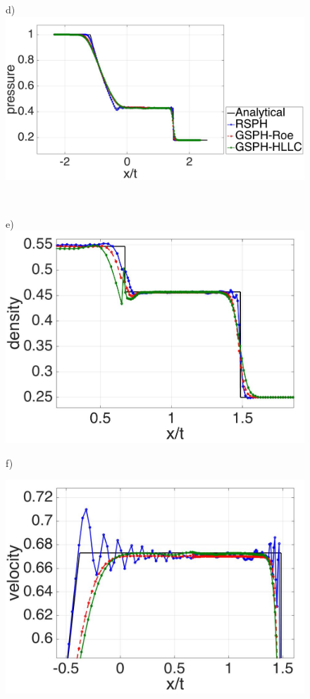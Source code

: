 \documentclass[review]{elsarticle}
\begin{document}
\begin{figure}[H]
\begin{minipage}{.45\textwidth}
    \end{minipage}%
    \begin{minipage}{.545 \textwidth}
        \centering d)
        \includegraphics[width=0.99 \textwidth,height=0.4954\textwidth]{./Figures/RCM-Sod-GSPH-compare-p}
    \end{minipage}%
    \\
    \begin{minipage}{.45\textwidth}
        \centering e)
        \includegraphics[width=0.99 \textwidth,height=0.6\textwidth]{./Figures/RCM-Sod-GSPH-compare-rho-zoom}
    \end{minipage}%
    \begin{minipage}{.545\textwidth}
    \centering f)
        \begin{flushleft}
        \includegraphics[width= 0.8174 \textwidth, height=0.4954 \textwidth]{./Figures/RCM-Sod-GSPH-compare-v-zoom}    

\end{flushleft}
\end{minipage}
\end{figure}
\end{document}
